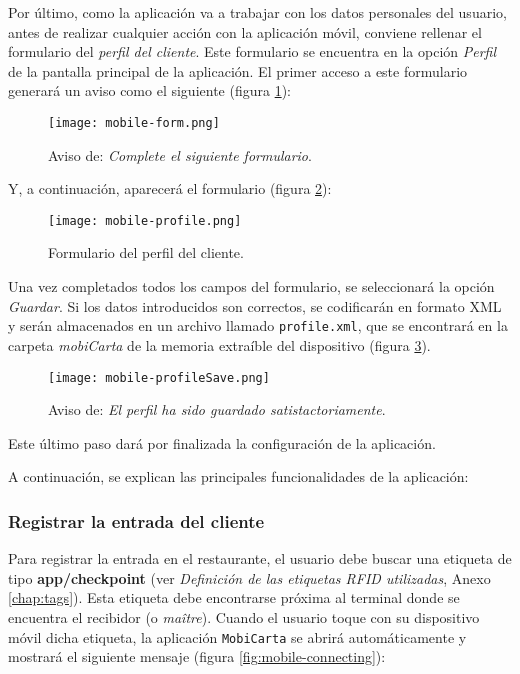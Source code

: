 Por último, como la aplicación va a trabajar con los datos personales del
usuario, antes de realizar cualquier acción con la aplicación móvil, conviene
rellenar el formulario del \emph{perfil del cliente}. Este formulario se
encuentra en la opción \emph{Perfil} de la pantalla principal de la aplicación.
El primer acceso a este formulario generará un aviso como el siguiente
(figura \ref{fig:mobile-form}):

  \begin{figure}[H]
    \begin{center}
      \texttt{[image: mobile-form.png]}
      \caption{Aviso de: \emph{Complete el siguiente formulario}.}
      \label{fig:mobile-form}
    \end{center}
  \end{figure}

Y, a continuación, aparecerá el formulario (figura \ref{fig:mobile-profile}):

  \begin{figure}[H]
    \begin{center}
      \texttt{[image: mobile-profile.png]}
      \caption{Formulario del perfil del cliente.}
      \label{fig:mobile-profile}
    \end{center}
  \end{figure}

Una vez completados todos los campos del formulario, se seleccionará la
opción \emph{Guardar}. Si los datos introducidos son correctos, se codificarán 
en formato \acs{XML} y serán almacenados en un archivo llamado
\texttt{profile.xml}, que se encontrará en la carpeta \emph{mobiCarta} de la 
memoria extraíble del dispositivo (figura \ref{fig:mobile-profileSave}).

  \begin{figure}[H]
    \begin{center}
      \texttt{[image: mobile-profileSave.png]}
      \caption{Aviso de: \emph{El perfil ha sido guardado satistactoriamente}.}
      \label{fig:mobile-profileSave}
    \end{center}
  \end{figure}

Este último paso dará por finalizada la configuración de la aplicación.

A continuación, se explican las principales funcionalidades de la aplicación:

\subsubsection{Registrar la entrada del cliente}
Para registrar la entrada en el restaurante, el usuario debe buscar una
etiqueta de tipo \textbf{app/checkpoint} (ver \emph{Definición de las etiquetas 
\acs{RFID} utilizadas}, Anexo \ref{chap:tags}). Esta etiqueta debe encontrarse
próxima al terminal donde se encuentra el recibidor (o \emph{maître}). Cuando
el usuario toque con su dispositivo móvil dicha etiqueta, la aplicación
\texttt{MobiCarta} se abrirá automáticamente y mostrará el siguiente
mensaje (figura \ref{fig:mobile-connecting}):

